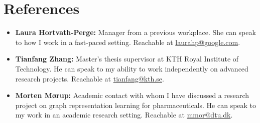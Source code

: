 \documentclass[11pt,a4paper]{moderncv}
\begin{document}
\section*{References}

\begin{itemize}
    \item \textbf{Laura Hortvath-Perge:} Manager from a previous workplace. She can speak to how I work in a fast-paced setting. Reachable at \href{mailto:laurahp@google.com}{laurahp@google.com}.
    \item \textbf{Tianfang Zhang:} Master's thesis supervisor at KTH Royal Institute of Technology. He can speak to my ability to work independently on advanced research projects. Reachable at \href{mailto:tianfang@kth.se}{tianfang@kth.se}.
    \item \textbf{Morten Mørup:} Academic contact with whom I have discussed a research project on graph representation learning for pharmaceuticals. He can speak to my work in an academic research setting. Reachable at \href{mailto:mmor@dtu.dk}{mmor@dtu.dk}.
\end{itemize}
\end{document}
